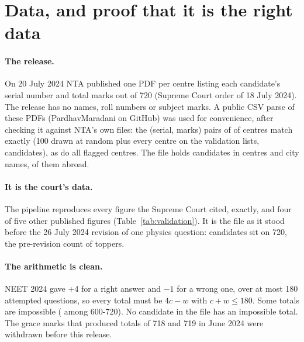 \documentclass[11pt]{article}
\begin{document}
\section{Data, and proof that it is the right data}\label{sec:data}
\paragraph{The release.} On 20 July 2024 NTA published one PDF per centre listing each candidate's serial number and total marks out of 720 (Supreme Court order of 18 July 2024). The release has no names, roll numbers or subject marks. A public CSV parse of these PDFs (PardhavMaradani on GitHub) was used for convenience, after checking it against NTA's own files: the (serial, marks) pairs of \VerifyMatch{} of \VerifyCentres{} centres match exactly (100 drawn at random plus every centre on the validation lists, \VerifyCandidates{} candidates), as do all \VerifyFlaggedMatch{} flagged centres. The file holds \Candidates{} candidates in \Centres{} centres and \Cities{} city names, \CitiesOverseas{} of them abroad.

\paragraph{It is the court's data.} The pipeline reproduces every figure the Supreme Court cited, exactly, and four of five other published figures (Table~\ref{tab:validation}). It is the file as it stood before the 26 July 2024 revision of one physics question: \FrEqSevenTwoZero{} candidates sit on 720, the pre-revision count of toppers.

\paragraph{The arithmetic is clean.} NEET 2024 gave +4 for a right answer and $-1$ for a wrong one, over at most 180 attempted questions, so every total must be $4c - w$ with $c + w \le 180$. Some totals are impossible (\ImpossibleScoresSixZeroZeroSevenTwoZero{} among 600-720). No candidate in the file has an impossible total. The grace marks that produced totals of 718 and 719 in June 2024 were withdrawn before this release.

\begin{table}[htbp]\centering
\caption{Published figures reproduced by the public file.}\label{tab:validation}

\par{}
\end{table}
\end{document}
